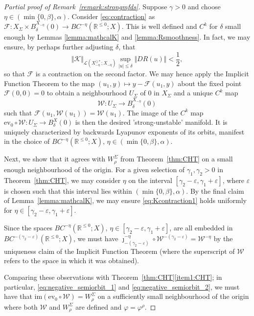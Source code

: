 \documentclass[a4paper, 12pt, oneside, reqno, notitlepage]{amsart}
\theoremstyle{plain}
\theoremstyle{definition}
\theoremstyle{remark}
\newcommand{\im}{\mathrm{im}}
\begin{document}
\begin{proof}[Partial proof of Remark~\ref{remark:strongmfds}]
Suppose $\gamma > 0$ and choose $\eta \in (\min\{0,\beta\},\alpha)$.
Consider \eqref{eq:contraction} as $\mathcal{F}: X_\Sigma \times B_\delta^{X_{-\eta}}(0) \to BC^{-\eta} (\mathbb{R}^{\leq 0};X)$.
This is well defined and $C^k$ for $\delta$ small enough by Lemmas \ref{lemma:mathcalK} and \ref{lemma:Rsmoothness}.
In fact, we may ensure, by perhaps further adjusting $\delta$, that
\begin{equation}
    \Vert \mathcal{K} \Vert_{\mathcal{L}(X_{-\eta}^{\odot *};X_{-\eta})} \sup_{|u| \leq \delta} \Vert D R(u) \Vert < \frac{1}{2},
    \label{eq:Kcontraction1}
\end{equation}
so that $\mathcal{F}$ is a contraction on the second factor.
We may hence apply the Implicit Function Theorem to the map $(u_1,y) \mapsto y-\mathcal{F}(u_1,y)$ about the fixed point $\mathcal{F}(0,0) = 0$ to obtain a neighbourhood $U_\Sigma$ of $0$ in $X_\Sigma$ and a unique $C^k$ map
\begin{displaymath}
    \mathcal{W}: U_\Sigma \to B_\delta^{X_{-\eta}}(0)
\end{displaymath}
such that $\mathcal{F}(u_1,\mathcal{W}(u_1)) = \mathcal{W}(u_1)$.
The image of the $C^k$ map $\mathrm{ev}_0 \circ \mathcal{W} : U_\Sigma \to B_\delta^X(0)$ is then the desired 'strong-unstable' manifold.
It is uniquely characterized by backwards Lyapunov exponents of its orbits, manifest in the choice of $BC^{-\eta} (\mathbb{R}^{\leq 0};X)$, $\eta \in (\min\{0,\beta\},\alpha)$.

Next, we show that it agrees with $W^\Sigma_\rho$ from Theorem~\ref{thm:CHT} on a small enough neighbourhood of the origin.
For a given selection of $\gamma_1,\gamma_2 > 0$ in Theorem~\ref{thm:CHT}, we may consider $\eta$ on the interval $ [\gamma_2-\varepsilon,\gamma_1+\varepsilon]$, where $\varepsilon$ is chosen such that this interval lies within $(\min\{0,\beta\},\alpha)$.
By the final claim of Lemma~\ref{lemma:mathcalK}, we may ensure \eqref{eq:Kcontraction1} holds uniformly for  $\eta \in [\gamma_2-\varepsilon,\gamma_1+\varepsilon]$.

Since the spaces $BC^{-\eta}(\mathbb{R}^{\leq 0}; X)$, $\eta \in [\gamma_2-\varepsilon,\gamma_1+\varepsilon]$, are all embedded in $BC^{-(\gamma_2-\varepsilon)}(\mathbb{R}^{\leq 0}; X)$, we must have $\jmath^{-\eta}_{-(\gamma_2-\varepsilon)} \circ \mathcal{W}^{-(\gamma_2-\varepsilon)} = \mathcal{W}^{-\eta}$ by the uniqueness claim of the Implicit Function Theorem (where the superscript of $\mathcal{W}$ refers to the space in which it was obtained).


Comparing these observations with Theorem~\ref{thm:CHT}\ref{item1:CHT}; in particular, \eqref{eq:negative_semiorbit_1} and \eqref{eq:negative_semiorbit_2}, we must have that $\im(\mathrm{ev}_0 \circ \mathcal{W}) = W^\Sigma_\rho$
on a sufficiently small neighbourhood of the origin where both $\mathcal{W}$ and $W^\Sigma_\rho$ are defined and $\varphi = \varphi^\rho$.
\end{proof}
\end{document}
